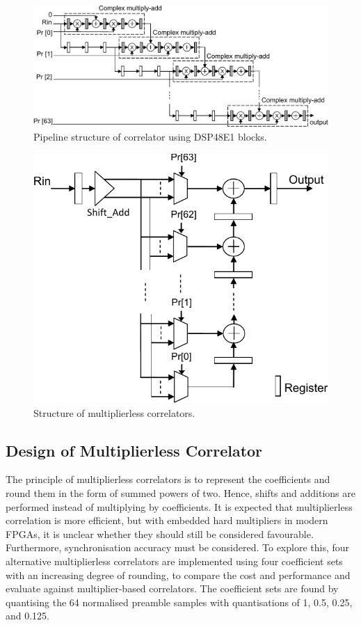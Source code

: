 \begin{figure}
	\centerline{\includegraphics [width=0.9\columnwidth] {figures/DSP48pp_correlator.pdf} }
	\caption{Pipeline structure of correlator using DSP48E1 blocks.}
	\label{fig:DSP48pp_correlator}
\end{figure}

\begin{figure}
	\centerline{\includegraphics [width=0.5\columnwidth] {figures/ML_correlator.pdf} }
	\caption{Structure of multiplierless correlators.}
	\label{fig:ML_correlator}
\end{figure}

\subsection{Design of Multiplierless Correlator}

The principle of multiplierless correlators is to represent the coefficients and round them in the form of summed powers of two.
Hence, shifts and additions are performed instead of multiplying by coefficients.
It is expected that multiplierless correlation is more efficient, but with embedded hard multipliers in modern FPGAs, it is unclear whether they should still be considered favourable.
Furthermore, synchronisation accuracy must be considered.
To explore this, four alternative multiplierless correlators are implemented using four coefficient sets with an increasing degree of rounding, to compare the cost and performance and evaluate against multiplier-based correlators.
The coefficient sets are found by quantising the 64 normalised preamble samples with quantisations of 1, 0.5, 0.25, and 0.125.

